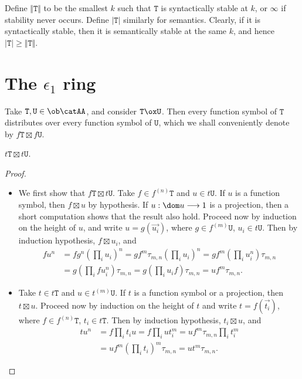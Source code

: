 \documentclass[a4paper, 12pt]{article}
\newcommand{\theory}{\mathtt}
\begin{document}
Define $\Vert \theory{T} \Vert$ to be the smallest $k$ such that $\theory{T}$ is syntactically stable at $k$, or $\infty$ if stability never occurs. Define $\vert \theory{T} \vert$ similarly for semantics. Clearly, if it is syntactically stable, then it is semantically stable at the same $k$, and hence $\vert \theory{T} \vert \geq \Vert \theory{T} \Vert$.

\section{The $\epsilon_1$ ring}

Take $\theory{T}, \theory{U} \in \ob \catAA$, and consider $\theory{T} \ox \theory{U}$. Then every function symbol of $\theory{T}$ distributes over every function symbol of $\theory{U}$, which we shall conveniently denote by $f \theory{T} \boxtimes f \theory{U}$.

\begin{proposition}
    $t \theory{T} \boxtimes t \theory{U}$.
\end{proposition}
\begin{proof}
    \begin{itemize}
        \item We first show that $f \theory{T} \boxtimes t \theory{U}$. Take $f \in f^{(n)} \theory{T}$ and $u \in t \theory{U}$. If $u$ is a function symbol, then $f \boxtimes u$ by hypothesis. If $u : \dom u \longrightarrow 1$ is a projection, then a short computation shows that the result also hold. Proceed now by induction on the height of $u$, and write $u = g ( \overrightarrow{u_i} )$, where $g \in f^{(m)} \theory{U}$, $u_i \in t \theory{U}$. Then by induction hypothesis, $f \boxtimes u_i$, and
            \begin{align*}
                f u^n &= f g^n \left( \prod_i u_i \right)^n
                 = g f^m \tau_{m, n} \left( \prod_i u_i \right)^n
                 = g f^m \left( \prod_i u_i^n \right) \tau_{m, n} \\
                &= g \left( \prod_i f u_i^n \right) \tau_{m, n}
                 = g \left( \prod_i u_i f \right) \tau_{m, n}
                 = u f^m \tau_{m, n} .
            \end{align*}
            
        \item Take $t \in t \theory{T}$ and $u \in t^{(m)} \theory{U}$. If $t$ is a function symbol or a projection, then $t \boxtimes u$. Proceed now by induction on the height of $t$ and write $t = f ( \overrightarrow{t_i} )$, where $f \in f^{(n)} \theory{T}$, $t_i \in t \theory{T}$. Then by induction hypothesis, $t_i \boxtimes u$, and
            \begin{align*}
                t u^n &= f \prod_i t_i u
                 = f \prod_i u t_i^m
                 = u f^m \tau_{m, n} \prod_i t_i^m \\
                &= u f^m \left( \prod_i t_i \right)^m \tau_{m, n} = u t^m \tau_{m, n} .
            \end{align*}
    \end{itemize}
\end{proof}
\end{document}
